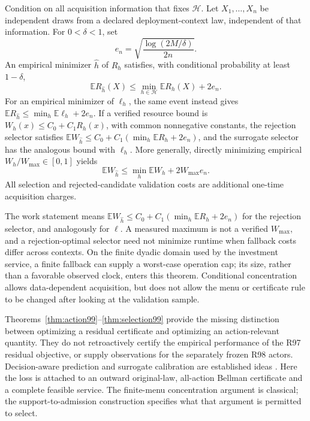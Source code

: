 \begin{theorem}\label{thm:selection99}
Condition on all acquisition information that fixes $\mathcal H$. Let $X_1,\ldots,X_n$ be independent draws from a declared deployment-context law, independent of that information. For $0<\delta<1$, set
\[
 e_n=\sqrt{\frac{\log(2M/\delta)}{2n}}.
\]
An empirical minimizer $\widehat h$ of $R_h$ satisfies, with conditional probability at least $1-\delta$,
\begin{equation}\label{eq:rejection99}
 \mathbb E R_{\widehat h}(X)\le\min_{h\in\mathcal H}\mathbb E R_h(X)+2e_n.
\end{equation}
For an empirical minimizer of $\ell_h$, the same event instead gives
$\mathbb E R_{\widehat h}\le\min_h\mathbb E\ell_h+2e_n$.
If a verified resource bound is $W_h(x)\le C_0+C_1R_h(x)$, with common nonnegative constants, the rejection selector satisfies $\mathbb E W_{\widehat h}\le C_0+C_1(\min_h\mathbb E R_h+2e_n)$, and the surrogate selector has the analogous bound with $\ell_h$. More generally, directly minimizing empirical $W_h/W_{\max}\in[0,1]$ yields
\[
 \mathbb E W_{\widehat h}\le\min_h\mathbb E W_h+2W_{\max}e_n.
\]
All selection and rejected-candidate validation costs are additional one-time acquisition charges.
\end{theorem}

The work statement means $\mathbb E W_{\widehat h}\le C_0+C_1(\min_h\mathbb E R_h+2e_n)$ for the rejection selector, and analogously for $\ell$. A measured maximum is not a verified $W_{\max}$, and a rejection-optimal selector need not minimize runtime when fallback costs differ across contexts. On the finite dyadic domain used by the investment service, a finite fallback can supply a worst-case operation cap; its size, rather than a favorable observed clock, enters this theorem. Conditional concentration allows data-dependent acquisition, but does not allow the menu or certificate rule to be changed after looking at the validation sample.

Theorems~\ref{thm:action99}--\ref{thm:selection99} provide the missing distinction between optimizing a residual certificate and optimizing an action-relevant quantity. They do not retroactively certify the empirical performance of the R97 residual objective, or supply observations for the separately frozen R98 actors. Decision-aware prediction and surrogate calibration are established ideas \citep{ElmachtoubGrigas2022,LiuGrigas2021}. Here the loss is attached to an outward original-law, all-action Bellman certificate and a complete feasible service. The finite-menu concentration argument is classical; the support-to-admission construction specifies what that argument is permitted to select.
